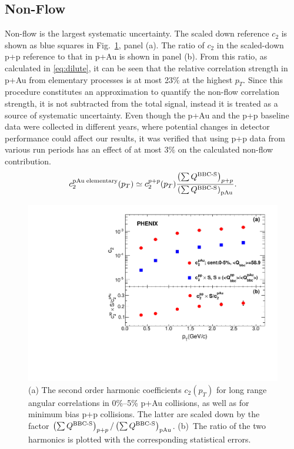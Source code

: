 \subsection{Non-Flow}
Non-flow is the largest systematic uncertainty. 
The scaled down reference $c_{2}$ is shown as blue squares in Fig.~\ref{fig:non_flow}, panel (a). The ratio of $c_2$ in the scaled-down p+p reference to that in p+Au is shown in panel (b). From this ratio, as calculated in \ref{eq:dilute}, it can be seen that the relative correlation strength in p+Au from elementary processes is at most 23$\%$ at the highest $p_T$. Since this procedure constitutes an approximation to quantify the non-flow correlation strength, it is not subtracted from the total signal, instead it is treated as a source of systematic uncertainty. Even though the p+Au and the p+p baseline data were collected in different years, where potential changes in detector performance could affect our results, it was verified that using p+p data from various run periods has an effect of at most 3$\%$ on the calculated non-flow contribution.
\begin{equation}
c_{2}^{{\rm pAu \; elementary}}(p_{T}) \simeq c_{2}^{p+p}(p_{T})
\frac{\left( \sum Q^{{\rm \text{BBC-S}}} \right)_{p+p}}
{\left( \sum Q^{{\rm \text{BBC-S}}} \right)_{{\rm pAu}}
}.
\label{eq:dilute}
\end{equation}

\begin{figure}[!h]
\begin{center}
\includegraphics[width=0.6\linewidth]{figs/non_flow.pdf}
\caption{(a) The second order harmonic coefficients $c_2(p_T)$ for long range angular correlations in
0\%--5\% p+Au collisions, as well as for minimum bias p+p collisions. The latter are scaled down by the factor $\left( \sum Q^{{\rm \text{BBC-S}}} \right)_{p+p} / \left( \sum Q^{{\rm
\text{BBC-S}}} \right)_{{\rm pAu}}$. (b)~The
ratio of the two harmonics is plotted with the corresponding statistical errors.}
\label{fig:non_flow}
\end{center}
\end{figure}

